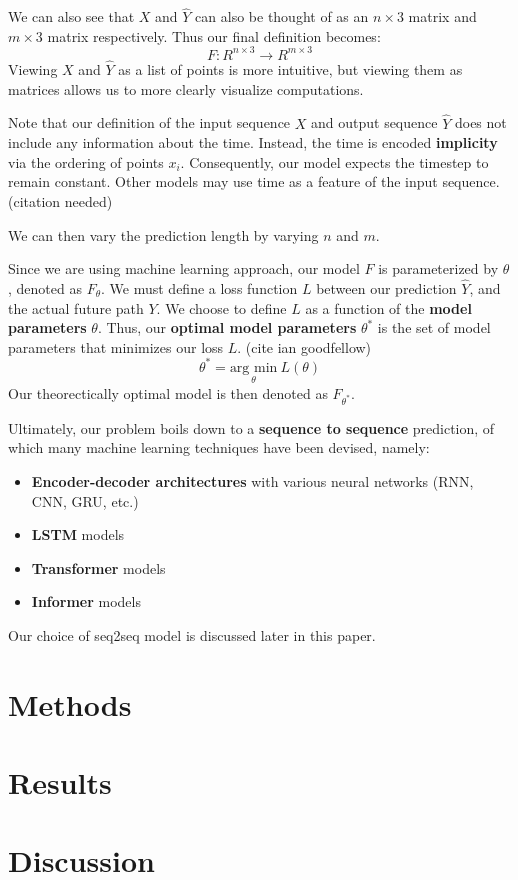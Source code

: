 \documentclass{article}
\begin{document}
We can also see that $X$ and $\hat{Y}$ can also be thought of as an $n \times 3$
matrix and $m \times 3$ matrix respectively. Thus our final definition becomes:
$$ F: R^{n \times 3} \to R^{m \times 3} $$
Viewing $X$ and $\hat{Y}$ as a list of points is more intuitive, but viewing 
them as matrices allows us to more clearly visualize computations.

Note that our definition of the input sequence $X$ and output sequence $\hat{Y}$ 
does not include any information about the time. Instead, the time is encoded
\textbf{implicity} via the ordering of points $x_i$. Consequently, our model
expects the timestep to remain constant. Other models may use time as a feature
of the input sequence. (citation needed)

We can then vary the prediction length by varying $n$ and $m$. 

Since we are using machine learning approach, our model $F$ is parameterized by
$\theta$, denoted as $F_{\theta}$. We must define a loss function $L$
between our prediction $\hat{Y}$, and the actual future path $Y$. We choose to 
define $L$ as a function of the \textbf{model parameters} $\theta$. Thus, our 
\textbf{optimal model parameters} $\theta^*$ is the set of model parameters that 
minimizes our loss $L$. (cite ian goodfellow)
$$ \theta^* = \underset{\theta}{\text{arg min}}\  L(\theta)$$
Our theorectically optimal model is then denoted as $F_{\theta^*}$.

Ultimately, our problem boils down to a \textbf{sequence to sequence} prediction, 
of which many machine learning techniques have been devised, namely:
\begin{itemize}
    \item {
        \textbf{Encoder-decoder architectures} with various neural networks 
        (RNN, CNN, GRU, etc.)
    }
    \item {
        \textbf{LSTM} models
    }
    \item {
        \textbf{Transformer} models
    }
    \item {
        \textbf{Informer} models
    }
\end{itemize}
Our choice of seq2seq model is discussed later in this paper.

\section{Methods}
\section{Results}
\section{Discussion}
\end{document}
